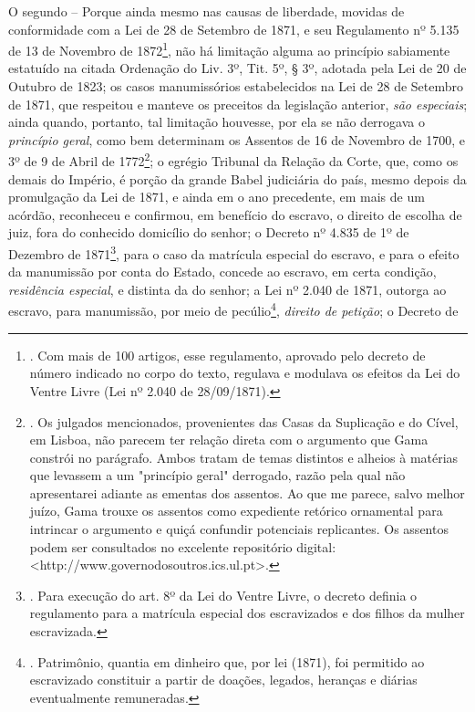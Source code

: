 O segundo -- Porque ainda mesmo nas causas de liberdade, movidas de
conformidade com a Lei de 28 de Setembro de 1871, e seu Regulamento nº
5.135 de 13 de Novembro de 1872\footnote{. Com mais de 100 artigos, esse
  regulamento, aprovado pelo decreto de número indicado no corpo do
  texto, regulava e modulava os efeitos da Lei do Ventre Livre (Lei nº
  2.040 de 28/09/1871).}, não há limitação alguma ao princípio
sabiamente estatuído na citada Ordenação do Liv. 3º, Tit. 5º, § 3º,
adotada pela Lei de 20 de Outubro de 1823; os casos manumissórios
estabelecidos na Lei de 28 de Setembro de 1871, que respeitou e manteve
os preceitos da legislação anterior, \emph{são especiais}; ainda quando,
portanto, tal limitação houvesse, por ela se não derrogava o
\emph{princípio geral}, como bem determinam os Assentos de 16 de
Novembro de 1700, e 3º de 9 de Abril de 1772\footnote{. Os julgados
  mencionados, provenientes das Casas da Suplicação e do Cível, em
  Lisboa, não parecem ter relação direta com o argumento que Gama
  constrói no parágrafo. Ambos tratam de temas distintos e alheios à
  matérias que levassem a um "princípio geral" derrogado, razão pela
  qual não apresentarei adiante as ementas dos assentos. Ao que me
  parece, salvo melhor juízo, Gama trouxe os assentos como expediente
  retórico ornamental para intrincar o argumento e quiçá confundir
  potenciais replicantes. Os assentos podem ser consultados no excelente
  repositório digital:
  \textless{}http://www.governodosoutros.ics.ul.pt\textgreater{}.}; o
egrégio Tribunal da Relação da Corte, que, como os demais do Império, é
porção da grande Babel judiciária do país, mesmo depois da promulgação
da Lei de 1871, e ainda em o ano precedente, em mais de um acórdão,
reconheceu e confirmou, em benefício do escravo, o direito de escolha de
juiz, fora do conhecido domicílio do senhor; o Decreto nº 4.835 de 1º de
Dezembro de 1871\footnote{. Para execução do art. 8º da Lei do Ventre
  Livre, o decreto definia o regulamento para a matrícula especial dos
  escravizados e dos filhos da mulher escravizada.}, para o caso da
matrícula especial do escravo, e para o efeito da manumissão por conta
do Estado, concede ao escravo, em certa condição, \emph{residência
especial}, e distinta da do senhor; a Lei nº 2.040 de 1871, outorga ao
escravo, para manumissão, por meio de pecúlio\footnote{. Patrimônio,
  quantia em dinheiro que, por lei (1871), foi permitido ao escravizado
  constituir a partir de doações, legados, heranças e diárias
  eventualmente remuneradas.}, \emph{direito de petição}; o Decreto de
